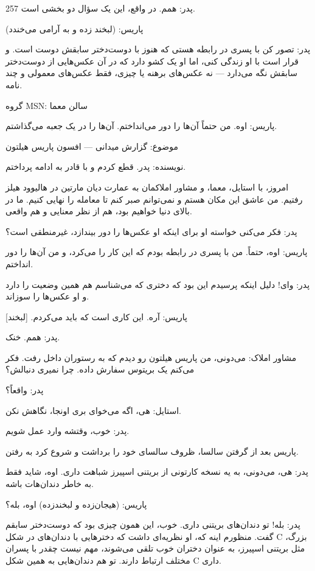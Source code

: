 257
پدر: همم. در واقع، این یک سؤال دو بخشی است.

پاریس: (لبخند زده و به آرامی می‌خندد)

پدر: تصور کن با پسری در رابطه هستی که هنوز با دوست‌دختر سابقش دوست است. و قرار است با او زندگی کنی، اما او یک کشو دارد که در آن عکس‌هایی از دوست‌دختر سابقش نگه می‌دارد — نه عکس‌های برهنه یا چیزی، فقط عکس‌های معمولی و چند نامه.

گروه MSN: سالن معما

پاریس: اوه. من حتماً آن‌ها را دور می‌انداختم. آن‌ها را در یک جعبه می‌گذاشتم.

موضوع: گزارش میدانی — افسون پاریس هیلتون

نویسنده: پدر. قطع کردم و با قادر به ادامه پرداختم.

امروز، با استایل، معما، و مشاور املاکمان به عمارت دیان مارتین در هالیوود هیلز رفتیم. من عاشق این مکان هستم و نمی‌توانم صبر کنم تا معامله را نهایی کنیم. ما در بالای دنیا خواهیم بود، هم از نظر معنایی و هم واقعی.

پدر: فکر می‌کنی خواسته او برای اینکه او عکس‌ها را دور بیندازد، غیرمنطقی است؟

پاریس: اوه، حتماً. من با پسری در رابطه بودم که این کار را می‌کرد، و من آن‌ها را دور انداختم.

پدر: وای! دلیل اینکه پرسیدم این بود که دختری که می‌شناسم هم همین وضعیت را دارد و او عکس‌ها را سوزاند.

پاریس: آره. این کاری است که باید می‌کردم. [لبخند]

پدر: همم. خنک.

مشاور املاک: می‌دونی، من پاریس هیلتون رو دیدم که به رستوران داخل رفت. فکر می‌کنم یک بریتوس سفارش داده. چرا نمیری دنبالش؟

پدر: واقعاً؟

استایل: هی، اگه می‌خوای بری اونجا، نگاهش نکن.

پدر: خوب، وقتشه وارد عمل شویم.

پاریس بعد از گرفتن سالسا، ظروف سالسای خود را برداشت و شروع کرد به رفتن.

پدر: هی، می‌دونی، به یه نسخه کارتونی از بریتنی اسپیرز شباهت داری. اوه، شاید فقط به خاطر دندان‌هات باشه.

پاریس: (هیجان‌زده و لبخند‌زده) اوه، بله؟

پدر: بله! تو دندان‌های بریتنی داری. خوب، این همون چیزی بود که دوست‌دختر سابقم گفت. منظورم اینه که، او نظریه‌ای داشت که دخترهایی با دندان‌های در شکل C بزرگ، مثل بریتنی اسپیرز، به عنوان دختران خوب تلقی می‌شوند، مهم نیست چقدر با پسران مختلف ارتباط دارند. تو هم دندان‌هایی به همین شکل C داری.

